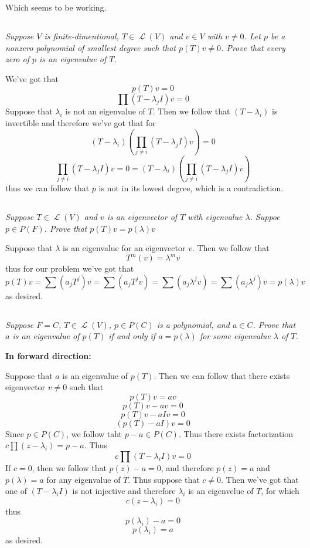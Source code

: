 \documentclass[11pt,oneside,titlepage]{book}
\DeclareMathOperator \map {\mathcal {L}}
\begin{document}
Which seems to be working.

\subsection{}

\textit{Suppose $V$ is finite-dimentional, $T \in \map(V)$ and $v \in V$ with $v \neq 0$.
  Let $p$ be a nonzero polynomial of smallest degree such that $p(T)v \neq 0$. Prove that every
  zero  of $p$ is an eigenvalue of $T$.}

We've got that
$$p(T)v = 0$$
$$\prod{(T - \lambda_j I)}v = 0$$
Suppose that $\lambda_i$ is not an eigenvalue of $T$. Then we follow that $(T - \lambda_i)$ is
invertible and therefore we've got that for 
$$(T - \lambda_i)\left(\prod_{j \neq i}{(T - \lambda_j I)} v \right) = 0$$
$$\prod_{j \neq i}{(T - \lambda_j I)} v  = 0 =
(T - \lambda_i)\left(\prod_{j \neq i}{(T - \lambda_j I)} v \right)$$
thus we can follow that $p$ is not in its lowest degree, which is a contradiction.

\subsection{}

\textit{Suppose $T \in \map(V)$ and $v$ is an eigenvector of $T$ with eigenvalue $\lambda$.
  Suppoe $p \in P(F)$. Prove that $p(T)v = p(\lambda)v$}

Suppose that $\lambda$ is an eigenvalue for an eigenvector $v$. Then we follow that
$$T^m(v) = \lambda^m v$$
thus for our problem we've got that
$$p(T)v = \sum{(a_j T^j)}v = \sum{(a_j T^j v)} = \sum{(a_j \lambda^j v)} =
\sum{(a_j \lambda^j )}v = p(\lambda)v $$
as desired.

\subsection{}

\textit{Suppose $F = C$, $T \in \map(V)$, $p \in P(C)$ is a polynomial, and $a \in C$.
  Prove that $a$ is an eigenvalue of $p(T)$ if and only if $a = p(\lambda)$ for some
  eigenvalue $\lambda$ of $T$.}

\textbf{In forward direction: }

Suppose that $a$ is an eigenvalue of $p(T)$. Then we can follow that there exists eigenvector
$v \neq 0$ such that
$$p(T)v = av$$
$$p(T)v - av = 0$$
$$p(T)v - aIv = 0$$
$$(p(T) - aI)v = 0$$
Since $p \in P(C)$, we follow taht $p - a \in P(C)$. Thus there exists factorization
$c\prod{(z - \lambda_i)} = p - a$. Thus
$$c\prod{(T - \lambda_iI)} v = 0$$
If $c = 0$, then we follow that $p(z) - a = 0$, and therefore $p(z) = a$ and $p(\lambda) = a$ for
any eigenvalue of $T$. Thus suppose that $c \neq 0$. Then we've got that one of $(T - \lambda_iI)$
is not injective and therefore $\lambda_i$ is an eigenvelue of $T$, for which
$$c(z - \lambda_i ) = 0$$
thus
$$p(\lambda_i) - a = 0$$
$$p(\lambda_i)  = a$$
as desired.
\end{document}

